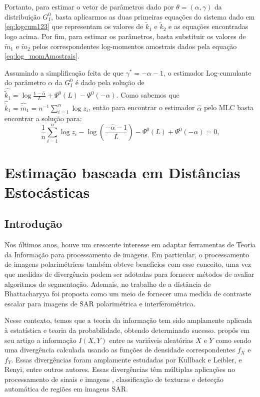 Portanto, para estimar o vetor de parâmetros dado por $\theta = (\alpha, \gamma)$ da distribuição $G_I^0$, basta aplicarmos as duas primeiras equações do sistema dado em \eqref{eq:logcum123} que representam os valores de $\widetilde{k}_{1}$ e $\widetilde{k}_{2}$ e as equações encontradas logo acima. Por fim, para estimar os parâmetros, basta substituir os valores de $\widetilde{m}_{1}$ e $\widetilde{m}_{2}$ pelos correspondentes log-momentos amostrais dados pela equação \eqref{eq:log_momAmostrais}. 

Assumindo a simplificação feita de que $\gamma^{*} = -\alpha - 1$, o estimador Log-cumulante do parâmetro $\alpha$ da $G_I^0$ é dado pela solução de $\widehat{\widetilde{k}_{1}} = \log \frac{1-\widehat{\alpha}}{L} + \Psi^{0}(L) - \Psi^{0}(-\alpha)$. Como sabemos que $\widehat{\widetilde{k}}_{1} = \widehat{\widetilde{m}}_{1} = n^{-1}\sum_{i=1}^{n}\log z_i$, então para encontrar o estimador $\widehat{\alpha}$ pelo MLC basta encontrar a solução para:
\begin{equation}
    \frac{1}{n}\sum_{i=1}^{n}\log z_i - \log \left ( \frac{-\widehat{\alpha}-1}{L} \right ) - \Psi^{0}(L) + \Psi^{0}(-\alpha) = 0,
    \label{eq:alphaEst_logCum}
\end{equation}

\section{Estimação baseada em Distâncias Estocásticas}

\subsection{Introdução}

Nos últimos anos, houve um crescente interesse em adaptar ferramentas de Teoria da Informação para processamento de imagens. 
Em particular, o processamento de imagens polarimétricas também obteve benefícios com esse conceito, uma vez que medidas de divergência podem ser adotadas para fornecer métodos de avaliar algoritmos de segmentação. 
Ademais, no trabalho de \citet{Goudail:04} a distância de Bhattacharyya foi proposta como um meio de fornecer uma medida de contraste escalar para imagens de SAR polarimétrica e interferométrica.

Nesse contexto, temos que a teoria da informação tem sido amplamente aplicada à estatística e teoria da probabilidade, obtendo determinado sucesso. 
\citet{Shannon48} propôs em seu artigo a informação $I(X,Y)$ entre as variáveis aleatórias $X$ e $Y$ como sendo uma divergência calculada usando as funções de densidade correspondentes $f_{X}$ e $f_{Y}$.
Essas divergências foram amplamente estudadas por Kullback e Leibler, e Renyi, entre outros autores. 
Essas divergências têm múltiplas aplicações no processamento de sinais e imagens \citep{Aviyente}, classificação de texturas e detecção automática de regiões em imagens SAR.

